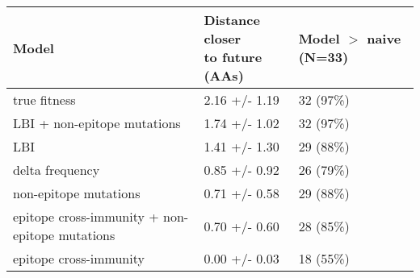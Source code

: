 \begin{tabular}{lll}
\toprule
                                          Model & \makecell{Distance closer \\ to future (AAs)} & \makecell{Model $>$ naive \\ (N=33)} \\
\midrule
                                   true fitness &                                 2.16 +/- 1.19 &                            32 (97\%) \\
                    LBI + non-epitope mutations &                                 1.74 +/- 1.02 &                            32 (97\%) \\
                                            LBI &                                 1.41 +/- 1.30 &                            29 (88\%) \\
                                delta frequency &                                 0.85 +/- 0.92 &                            26 (79\%) \\
                          non-epitope mutations &                                 0.71 +/- 0.58 &                            29 (88\%) \\
 epitope cross-immunity + non-epitope mutations &                                 0.70 +/- 0.60 &                            28 (85\%) \\
                         epitope cross-immunity &                                 0.00 +/- 0.03 &                            18 (55\%) \\
\bottomrule
\end{tabular}
